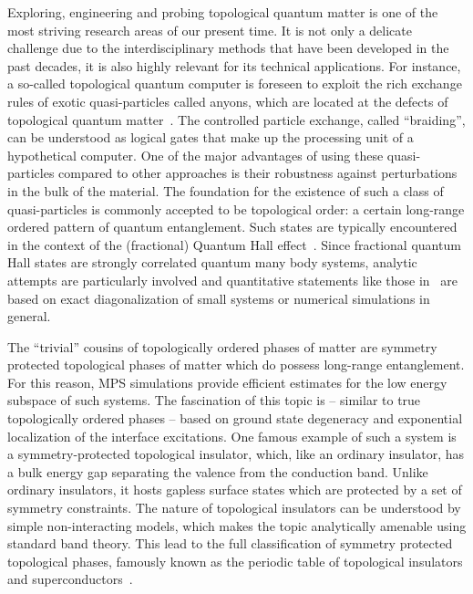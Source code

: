 Exploring, engineering and probing topological quantum matter is one of the most striving research areas of our present time.
It is not only a delicate challenge due to the interdisciplinary methods that have been developed in the past decades, it is also highly relevant for its technical applications.
For instance, a so-called topological quantum computer is foreseen to exploit the rich exchange rules of exotic quasi-particles called anyons, which are located at the defects of topological quantum matter~\cite{Freedman2002}.
The controlled particle exchange, called ``braiding'', can be understood as logical gates that make up the processing unit of a hypothetical computer.
One of the major advantages of using these quasi-particles compared to other approaches is their robustness against perturbations in the bulk of the material.
The foundation for the existence of such a class of quasi-particles is commonly accepted to be topological order: a certain long-range ordered pattern of quantum entanglement.
Such states are typically encountered in the context of the (fractional) Quantum Hall effect~\cite{Moore1991,Read1996,Levin2007,Lee2007,Storni2010,Rezayi2017}.
Since fractional quantum Hall states are strongly correlated quantum many body systems, analytic attempts are particularly involved and quantitative statements like those in~\cite{Storni2010} are based on exact diagonalization of small systems or numerical simulations in general.

The ``trivial'' cousins of topologically ordered phases of matter are symmetry protected topological phases of matter which do possess long-range entanglement.
For this reason, MPS simulations provide efficient estimates for the low energy subspace of such systems.
The fascination of this topic is -- similar to true topologically ordered phases -- based on ground state degeneracy and exponential localization of the interface excitations.
One famous example of such a system is a symmetry-protected topological insulator, which, like an ordinary insulator, has a bulk energy gap separating the valence from the conduction band.
Unlike ordinary insulators, it hosts gapless surface states which are protected by a set of symmetry constraints.
The nature of topological insulators can be understood by simple non-interacting models, which makes the topic analytically amenable using standard band theory.
This lead to the full classification of symmetry protected topological phases, famously known as the periodic table of topological insulators and superconductors~\cite{Altland1997,Kitaev2009}.

